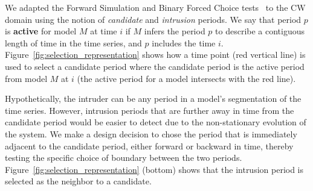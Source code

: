 \documentclass[letterpaper]{article} %
\newcommand{\kibitz}[2]{\ifnum\Comments=1{\textcolor{#1}{#2}}\fi}
\newcommand{\bjg}[1]{\kibitz{purple}{[BG:#1]}}
\begin{document}



We adapted the Forward Simulation and Binary Forced Choice tests~\cite{doshi2017roadmap} to the CW domain using the notion of \textit{candidate} and \textit{intrusion} periods.
We say that period $p$ is \textbf{active} for model $M$ at time $i$ if  $M$ infers the period $p$ to describe a contiguous length of time in the time series, and $p$ includes the time $i$.
Figure~\ref{fig:selection_representation} shows how a time point (red vertical line) is used to select a candidate period where the candidate period is the active period from model $M$ at $i$ (the active period for a model intersects with the red line).

Hypothetically, the intruder can be any period in a model's segmentation of the time series.
However, intrusion periods that are further away in time from the candidate period would be easier to detect due to the non-stationary evolution of the system.
We make a design decision to chose the period that is immediately adjacent to the candidate period, either forward or backward in time, thereby testing the specific choice of boundary between the two periods.
Figure~\ref{fig:selection_representation} (bottom) shows that the intrusion period is selected as the neighbor to a candidate.
\end{document}
